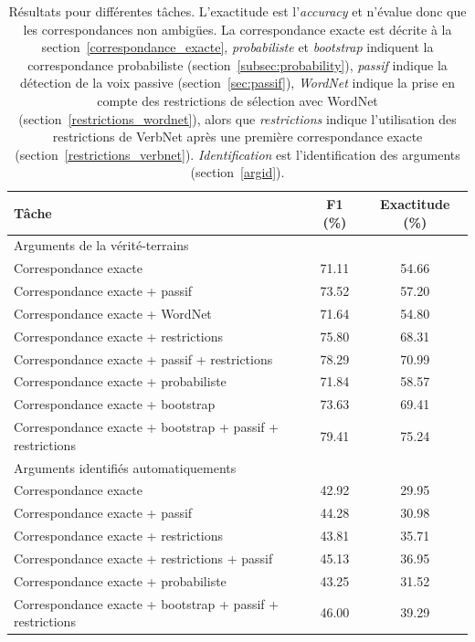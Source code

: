 \begin{table}
    \centering
    \begin{tabular}{lcc}
        \toprule
        Tâche & F1 (\%) & Exactitude (\%) \\
        \midrule                                                   
        Arguments de la vérité-terrains & & \\
        \midrule 
        Correspondance exacte                                      & 71.11  & 54.66 \\
        Correspondance exacte + passif                             & 73.52  & 57.20 \\
        Correspondance exacte + WordNet               & 71.64  & 54.80 \\
        Correspondance exacte + restrictions             & 75.80  & 68.31 \\
        Correspondance exacte + passif + restrictions    & 78.29  & 70.99 \\
        Correspondance exacte + probabiliste                       & 71.84  & 58.57 \\
        Correspondance exacte + bootstrap                          & 73.63  & 69.41 \\
        Correspondance exacte + bootstrap + passif + restrictions  & 79.41  & 75.24 \\
        \midrule                                                   
        Arguments identifiés automatiquements & & \\
        \midrule
        Correspondance exacte                          & 42.92  & 29.95 \\
        Correspondance exacte + passif                 & 44.28  & 30.98 \\
        Correspondance exacte + restrictions          & 43.81  & 35.71 \\
        Correspondance exacte + restrictions + passif  & 45.13  & 36.95 \\
        Correspondance exacte + probabiliste           & 43.25  & 31.52 \\
        Correspondance exacte + bootstrap + passif + restrictions  & 46.00 & 39.29 \\
        \bottomrule
    \end{tabular}

    \caption{\label{table:results}Résultats pour différentes tâches.
        L'exactitude est l'\textit{accuracy} et n'évalue donc que les
        correspondances non ambigües. La correspondance exacte est décrite à la
        section~\ref{correspondance_exacte}, \textit{probabiliste} et
        \textit{bootstrap} indiquent la correspondance probabiliste
        (section~\ref{subsec:probability}), \textit{passif} indique la
        détection de la voix passive (section~\ref{sec:passif}),
        \textit{WordNet} indique la prise en compte des restrictions de
        sélection avec WordNet (section~\ref{restrictions_wordnet}), alors que
        \textit{restrictions} indique l'utilisation des restrictions de VerbNet
    après une première correspondance exacte
(section~\ref{restrictions_verbnet}). \textit{Identification} est
l'identification des arguments (section~\ref{argid}).}
\end{table}


